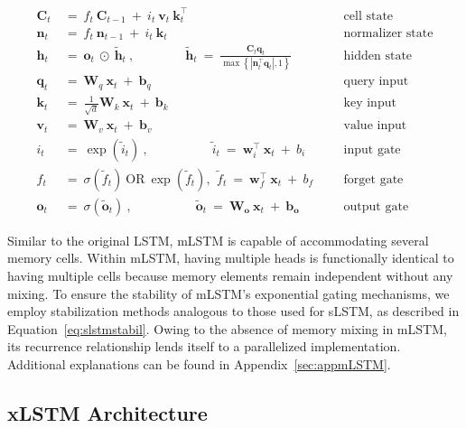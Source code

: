 \begin{align}
\label{eq:mlstm_recurrent_begin}
\mathbf{C}_t \ &= \  f_t \ \mathbf{C}_{t-1} \ + \ 
  i_t \ \mathbf{v}_t \ \mathbf{k}_t^\top & &  &\text{cell state} \\
\mathbf{n}_t \ &= \  f_t \ \mathbf{n}_{t-1} \ + \ 
  i_t \ \mathbf{k}_t & &  &\text{normalizer state} \\
\mathbf{h}_t  \ &= \ \mathbf{o}_t \ \odot \ \tilde{\mathbf{h}}_t
\ , \qquad \qquad 
\tilde{\mathbf{h}}_t \ = \   \frac{\mathbf{C}_t \mathbf{q}_t}{\max \left\{ |\mathbf{n}_t^\top \mathbf{q}_t|, 1 \right\} }
   &&&\text{hidden state} \\
\mathbf{q}_t \ &= \ \mathbf{W}_q \ \mathbf{x}_t \ + \ \mathbf{b}_q  & &  &\text{query input} \\
\mathbf{k}_t \ &= \ \frac{1}{\sqrt{d}} \mathbf{W}_k \ \mathbf{x}_t \ + \ \mathbf{b}_k  & &  &\text{key input} \\
\mathbf{v}_t \ &= \ \mathbf{W}_v \ \mathbf{x}_t \ + \ \mathbf{b}_v  & &  &\text{value input} \\
i_t \ &= \  \exp\!\left( \tilde{i}_t \right) \ , 
 \qquad \qquad \quad
  \tilde{i}_t \ = \ \mathbf{w}^\top_{i} \ \mathbf{x}_t \ + \  b_{i} \ \
  &&&\text{input gate} \\
f_t \ &= \ \sigma \!  \left(  \tilde{f}_t \right) \ \text{OR} \ \exp\!\left(  \tilde{f}_t \right) , \ \, 
\tilde{f}_t \ = \ \mathbf{w}^\top_{f} \ \mathbf{x}_t  \ + \
  b_{f}
  &&& \text{forget gate} \\
\label{eq:mlstm_recurrent_end}
\mathbf{o}_t \ &= \ \sigma \left( \tilde{\mathbf{o}}_t \right) \ , \qquad \qquad \quad
  \tilde{\mathbf{o}}_t  \ = \ \mathbf{W}_{\mathbf{o}} \ \mathbf{x}_t \ + \
  \mathbf{b}_{\mathbf{o}}
  &&&\text{output gate} 
\end{align}

Similar to the original LSTM, mLSTM is capable of accommodating several memory cells. Within mLSTM, having multiple heads is functionally identical to having multiple cells because memory elements remain independent without any mixing. To ensure the stability of mLSTM's exponential gating mechanisms, we employ stabilization methods analogous to those used for sLSTM, as described in Equation~\ref{eq:slstmstabil}. Owing to the absence of memory mixing in mLSTM, its recurrence relationship lends itself to a parallelized implementation. Additional explanations can be found in Appendix~\ref{sec:appmLSTM}.

\subsection{xLSTM Architecture}
\label{sec:xLSTMarch}

